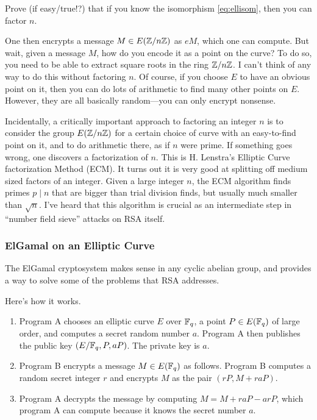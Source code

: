 \documentclass{book}
\begin{document}
\begin{exercise}
Prove (if easy/true!?) that if you know
the isomorphism \eqref{eq:ellisom}, then you
can factor $n$.
\end{exercise}

One then encrypts a message $M\in E(\mathbb{Z}/n\mathbb{Z})$
as $e M$, which one can compute.
But wait, given a message $M$, how do you encode
it as a point on the curve?  To do so, you need to be
able to extract square roots in the ring $\mathbb{Z}/n\mathbb{Z}$.
I can't think of any way to do this without factoring $n$.
Of course, if you choose $E$ to have an obvious point
on it, then you can do lots of arithmetic to find many
other points on $E$.  However, they are all basically random---you
can only encrypt nonsense.

Incidentally, a critically important approach to
factoring an integer $n$ is to consider the
group $E(\mathbb{Z}/n\mathbb{Z})$ for a certain choice of curve
with an easy-to-find point on it, and to do arithmetic
there, as if $n$ were prime.  If something goes wrong,
one discovers a factorization of $n$.  This is
H. Lenstra's Elliptic Curve factorization Method (ECM).
It turns out it is very good at splitting off medium
sized factors of an integer.  Given a large integer
$n$, the ECM algorithm finds primes $p\mid n$ that
are bigger than trial division finds, but usually much
smaller than $\sqrt{n}$.   I've heard that this algorithm
is crucial as an intermediate step in ``number field
sieve'' attacks on RSA itself.

\subsubsection{ElGamal on an Elliptic Curve}

The ElGamal cryptosystem makes sense in any cyclic abelian group,
and provides a way to solve some of the problems that RSA addresses.

Here's how it works.
\begin{enumerate}
\item Program A chooses an elliptic curve $E$ over $\mathbb{F}_q$, a point
$P\in E(\mathbb{F}_q)$ of large order, and computes a secret random number $a$.   Program
A then publishes the public key $(E/\mathbb{F}_q, P, aP)$.  The private key is $a$.
\item Program B encrypts a message $M \in E(\mathbb{F}_q)$ as follows.  Program B
computes a random secret integer $r$ and encrypts $M$ as the pair
$(rP,M + raP)$.
\item Program A decrypts the message by computing
$M = M + raP - arP$, which program A can compute because
it knows the secret number $a$.
\end{enumerate}
\end{document}
